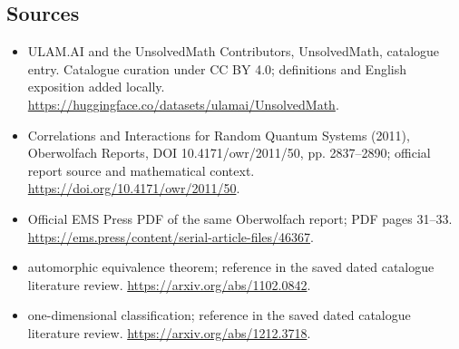 \documentclass[11pt]{article}
\begin{document}
\subsection{Sources}
\begin{itemize}
\item[\hypertarget{source:statement:1}{S1}] ULAM.AI and the UnsolvedMath Contributors, UnsolvedMath, catalogue entry. Catalogue curation under CC BY 4.0; definitions and English exposition added locally.
\url{https://huggingface.co/datasets/ulamai/UnsolvedMath}.
\item[\hypertarget{source:statement:2}{S2}] Correlations and Interactions for Random Quantum Systems (2011), Oberwolfach Reports, DOI 10.4171/owr/2011/50, pp. 2837--2890; official report source and mathematical context.
\url{https://doi.org/10.4171/owr/2011/50}.
\item[\hypertarget{source:statement:3}{S3}] Official EMS Press PDF of the same Oberwolfach report; PDF pages 31--33.
\url{https://ems.press/content/serial-article-files/46367}.
\item[\hypertarget{source:statement:4}{S4}] automorphic equivalence theorem; reference in the saved dated catalogue literature review.
\url{https://arxiv.org/abs/1102.0842}.
\item[\hypertarget{source:statement:5}{S5}] one-dimensional classification; reference in the saved dated catalogue literature review.
\url{https://arxiv.org/abs/1212.3718}.
\end{itemize}
\label{end:statement}
\end{document}
